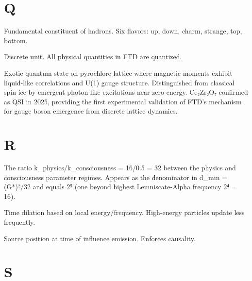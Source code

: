 \documentclass[
  11pt,
  letterpaper,
  twoside,
  openright]{book}
\providecommand{\tightlist}{%
  \setlength{\itemsep}{0pt}\setlength{\parskip}{0pt}}
\begin{document}
\section{Q}\label{q}

\begin{description}
\tightlist
\item[\textbf{Quark}]
Fundamental constituent of hadrons. Six flavors: up, down, charm,
strange, top, bottom.
\item[\textbf{Quantum}]
Discrete unit. All physical quantities in FTD are quantized.
\item[\textbf{Quantum Spin Ice (QSI)}]
Exotic quantum state on pyrochlore lattice where magnetic moments
exhibit liquid-like correlations and U(1) gauge structure. Distinguished
from classical spin ice by emergent photon-like excitations near zero
energy. Ce₂Zr₂O₇ confirmed as QSI in 2025, providing the first
experimental validation of FTD's mechanism for gauge boson emergence
from discrete lattice dynamics.
\end{description}

\section{R}\label{r}

\begin{description}
\tightlist
\item[\textbf{Regime Ratio (32)}]
The ratio k\_physics/k\_consciousness = 16/0.5 = 32 between the physics
and consciousness parameter regimes. Appears as the denominator in
d\_min = (G*)²/32 and equals 2⁵ (one beyond highest Lemniscate-Alpha
frequency 2⁴ = 16).
\item[\textbf{Relativity}]
Time dilation based on local energy/frequency. High-energy particles
update less frequently.
\item[\textbf{Retarded Position}]
Source position at time of influence emission. Enforces causality.
\end{description}

\section{S}\label{s}
\end{document}
